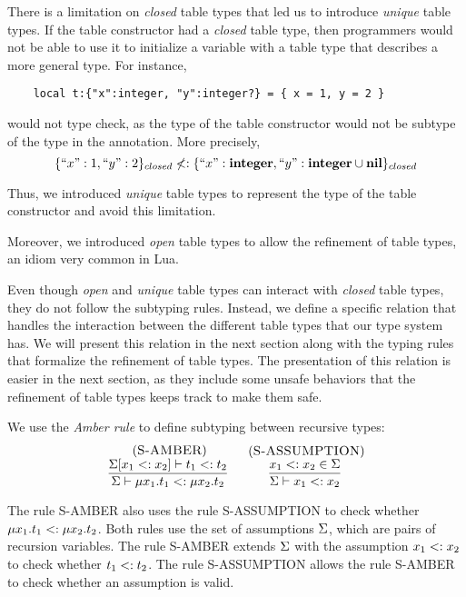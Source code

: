 There is a limitation on \emph{closed} table types that led us to
introduce \emph{unique} table types.
If the table constructor had a \emph{closed} table type, then
programmers would not be able to use it to initialize a variable with
a table type that describes a more general type.
For instance,
\begin{verbatim}
    local t:{"x":integer, "y":integer?} = { x = 1, y = 2 }
\end{verbatim}
would not type check, as the type of the table constructor would not
be subtype of the type in the annotation.
More precisely,
\[
\{``x":1, ``y":2\}_{closed} \not<: \{``x":\mathbf{integer}, ``y":\mathbf{integer} \cup \mathbf{nil}\}_{closed}
\]

Thus, we introduced \emph{unique} table types to represent the type of
the table constructor and avoid this limitation.

Moreover, we introduced \emph{open} table types to allow the refinement of table types,
an idiom very common in Lua.

Even though \emph{open} and \emph{unique} table types can interact with
\emph{closed} table types, they do not follow the subtyping rules.
Instead, we define a specific relation that handles the interaction
between the different table types that our type system has.
We will present this relation in the next section along with the typing
rules that formalize the refinement of table types.
The presentation of this relation is easier in the next section,
as they include some unsafe behaviors that the refinement of
table types keeps track to make them safe.

We use the \emph{Amber rule} \citep{cardelli1986amber} to define
subtyping between recursive types:
\[
\begin{array}{c}
\begin{array}{c}
\; (\textsc{S-AMBER})\\
\dfrac{\Sigma[x_{1} <: x_{2}] \vdash t_{1} <: t_{2}}
      {\Sigma \vdash \mu x_{1}.t_{1} <: \mu x_{2}.t_{2}}
\end{array}
\;
\begin{array}{c}
\; (\textsc{S-ASSUMPTION})\\
\dfrac{x_{1} <: x_{2} \in \Sigma}
      {\Sigma \vdash x_{1} <: x_{2}}
\end{array}
\end{array}
\]

The rule \textsc{S-AMBER} also uses the rule \textsc{S-ASSUMPTION}
to check whether $\mu x_{1}.t_{1} <: \mu x_{2}.t_{2}$.
Both rules use the set of assumptions $\Sigma$,
which are pairs of recursion variables.
The rule \textsc{S-AMBER} extends $\Sigma$ with the assumption
$x_{1} <: x_{2}$ to check whether $t_{1} <: t_{2}$.
The rule \textsc{S-ASSUMPTION} allows the rule \textsc{S-AMBER}
to check whether an assumption is valid.

